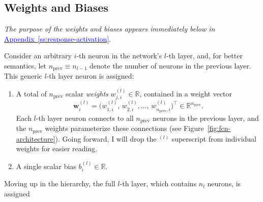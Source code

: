 \documentclass[11pt, a4paper]{article}
\newcommand{\myhref}[2]{\hyperref[#1]{\textcolor{blue}{#2}}}
\renewcommand{\vec}[1]{\bm{#1}}
\newcommand{\w}{\vec{w}}
\begin{document}
\subsection{Weights and Biases}
\small{\textit{The purpose of the weights and biases appears immediately below in} \myhref{ss:response-activation}{Appendix~\ref{ss:response-activation}}.}

\vspace{2mm}
Consider an arbitrary $ i $-th neuron in the network's $ l $-th layer, and, for better semantics, let $ n_{\text{prev}} \equiv n_{l - 1} $ denote the number of neurons in the previous layer.
This generic $ l $-th layer neuron is assigned:
\begin{enumerate}

    \item A total of $ n_{\text{prev}} $ scalar \textit{weights} $ w_{j,i}^{(l)} \in \mathbb{R} $, contained in a weight vector
    \begin{equation}
        \w_{i}^{(l)} = \Big(w_{1, i}^{(l)}, \, w_{2, i}^{(l)}, \ldots, \, w_{n_{\text{prev}}, i}^{(l)}\Big)^{\top} \in \mathbb{R}^{n_{\text{prev}}}. \label{eq:weight-vector}
    \end{equation}
    Each $ l $-th layer neuron connects to all $ n_{\text{prev}} $ neurons in the previous layer, and the $ n_{\text{prev}} $ weights parameterize these connections (see Figure~\ref{fig:fcn-architecture}).
    Going forward, I will drop the $ {}^{(l)} $ superscript from individual weights for easier reading.


    \item A single scalar bias $ b^{(l)}_{i} \in \mathbb{R} $.

\end{enumerate}
Moving up in the hierarchy, the full $ l $-th layer, which contains $ n_{l} $ neurons, is assigned
\end{document}
